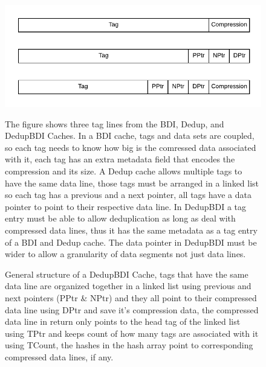 \begin{figure}
    \includegraphics[width=\textwidth]{BDIvsDedupvsDedupBDI_Tag.pdf}
    \label{fig:DedupBDI_Tag}
    \caption[DedupBDI Tag Array]{The figure shows three tag lines from the BDI, Dedup, and DedupBDI Caches. In a BDI cache, tags and data sets are coupled, so each tag needs to know how big is the comressed data associated with it, each tag has an extra metadata field that encodes the compression and its size. A Dedup cache allows multiple tags to have the same data line, those tags must be arranged in a linked list so each tag has a previous and a next pointer, all tags have a data pointer to point to their respective data line. In DedupBDI a tag entry must be able to allow deduplication as long as deal with compressed data lines, thus it has the same metadata as a tag entry of a BDI and Dedup cache. The data pointer in DedupBDI must be wider to allow a granularity of data segments not just data lines.}
\end{figure}
\begin{figure}
    \label{fig:DedupBDI}
    \caption[DedupBDI Cache]{General structure of a DedupBDI Cache, tags that have the same data line are organized together in a linked list using previous and next pointers (PPtr \& NPtr) and they all point to their compressed data line using DPtr and save it's compression data, the compressed data line in return only points to the head tag of the linked list using TPtr and keeps count of how many tags are associated with it using TCount, the hashes in the hash array point to corresponding compressed data lines, if any.}
\end{figure}
